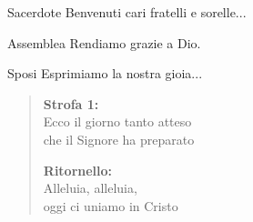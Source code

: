 \begin{dialoghi}
	\item[Sacerdote] Benvenuti cari fratelli e sorelle...
	\item[Assemblea] Rendiamo grazie a Dio.
	\item[Sposi] Esprimiamo la nostra gioia...
\end{dialoghi}

\begin{verse}
	\begin{mystrofe}
		\textbf{Strofa 1:} \\
		Ecco il giorno tanto atteso \\
		che il Signore ha preparato
	\end{mystrofe}

	\begin{myritornello}
		\textbf{Ritornello:} \\
		Alleluia, alleluia, \\
		oggi ci uniamo in Cristo
	\end{myritornello}
\end{verse}